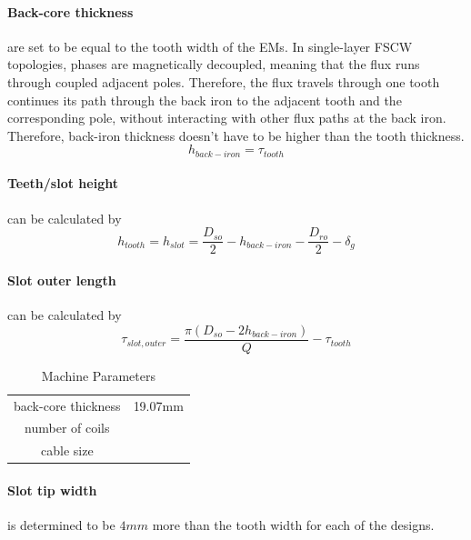 \documentclass [a4 paper, 11pt, titlepage] {article}
\begin{document}
	\paragraph{Back-core thickness} are set to be equal to the tooth width of the EMs. In single-layer FSCW topologies, phases are magnetically decoupled, meaning that the flux runs through coupled adjacent poles. Therefore, the flux travels through one tooth continues its path through the back iron to the adjacent tooth and the corresponding pole, without interacting with other flux paths at the back iron. Therefore, back-iron thickness doesn't have to be higher than the tooth thickness. 
	\begin{equation}
		h_{back-iron}=\tau_{tooth}
	\end{equation}

	\paragraph{Teeth/slot height} can be calculated by
	\begin{equation}
		h_{tooth}=h_{slot}=\frac{D_{so}}{2}-h_{back-iron}-\frac{D_{ro}}{2}-\delta_g
	\end{equation}
	
	\paragraph{Slot outer length} can be calculated by
	\begin{equation}
		\tau_{slot,outer}=\frac{\pi (D_{so}-2h_{back-iron})}{Q}-\tau_{tooth}
	\end{equation}
	
		\begin{table}[h]
		\begin{center}
			\begin{tabular}{c|c}
				 &  \\
				\hline
				back-core thickness & 19.07mm \\
				number of coils & \\
				cable size & 
			\end{tabular}
		\end{center}
		\caption{Machine Parameters}
		\label{tab:machineParameters}
	\end{table}
	
	\paragraph{Slot tip width} is determined to be $4mm$ more than the tooth width for each of the designs.
	
\end{document}
